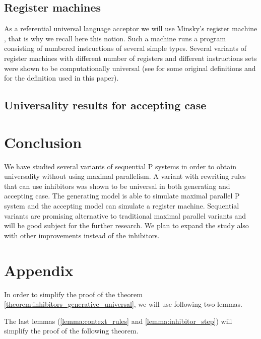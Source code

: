\documentclass[llncs,submission,copyright,creativecommons]{../lib/lncs/llncs}
\begin{document}

\subsection{Register machines} %
\label{sub:register_machines}
  As a referential universal language acceptor we will use Minsky's register machine \cite{Ionescu:jucs_10_5:on_p_systems_with}, that is why we recall here this notion. Such a machine runs a program consisting of numbered instructions of several simple types. Several variants of register machines with different number of registers and different instructions sets were shown to be computationally universal (see \cite{Ibarra:2005:SPS:2111772.2111880} for some original definitions and \cite{Khrisna03threeuniversality} for the definition used in this paper).


  

\subsection{Universality results for accepting case} %
\label{sub:universality_results_for_accepting_case}




\section{Conclusion}
\label{sec:conclusion}
We have studied several variants of sequential P systems in order to obtain universality without using maximal parallelism.
A variant with rewriting rules that can use inhibitors was shown to be universal in both generating and accepting case. The generating model is able to simulate maximal parallel P system and the accepting model can simulate a register machine.
Sequential variants are promising alternative to traditional maximal parallel variants and will be good subject for the further research. We plan to expand the study also with other improvements instead of the inhibitors.


\section{Appendix} %
\label{sec:appendix}

In order to simplify the proof of the theorem \ref{theorem:inhibitors_generative_universal}, we will use following two lemmas.


The last lemmas (\ref{lemma:context_rules} and \ref{lemma:inhibitor_step}) will simplify the proof of the following theorem.


\end{document}
